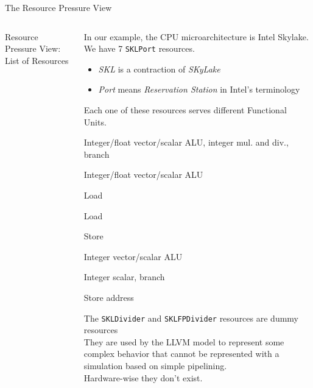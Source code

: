 \begin{frame}{The Resource Pressure View}

\begin{columns}

\begin{block}{Resource Pressure View: List of Resources}
\end{block}


\begin{overprint}
\raggedright\bigskip
In our example, the CPU microarchitecture is \alert{Intel Skylake}.\\
We have \alert{7 \texttt{SKLPort} resources}.\footnotemark[1]
\begin{itemize}
\item \emph{SKL} is a contraction of \emph{SKyLake}
\item \emph{Port} means \emph{Reservation Station} in Intel's terminology
\end{itemize}
Each one of these resources serves different Functional Units.
\vfill
%
\begin{description}
\item[\texttt{SKLPort0}] Integer/float vector/scalar ALU, integer mul. and div., branch
\item[\texttt{SKLPort1}] Integer/float vector/scalar ALU
\item[\texttt{SKLPort2}] Load
\item[\texttt{SKLPort3}] Load
\item[\texttt{SKLPort4}] Store
\item[\texttt{SKLPort5}] Integer vector/scalar ALU
\item[\texttt{SKLPort6}] Integer scalar, branch
\item[\texttt{SKLPort7}] Store address
\end{description}
%
\raggedright\bigskip
The \texttt{SKLDivider} and \texttt{SKLFPDivider} resources are 
\alert{dummy resources}\\
\bigskip
They are used by the LLVM model to represent some complex
behavior that cannot be represented with a simulation based on simple pipelining.\\
\bigskip
Hardware-wise they don't exist.
\end{overprint}

\end{columns}


\end{frame}


